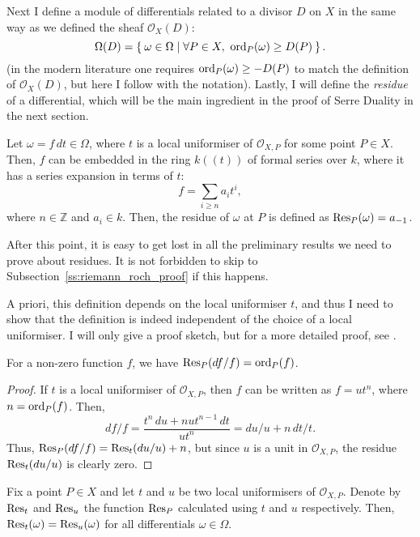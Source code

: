 Next I define a module of differentials related to a divisor $D$
on $X$ in the same way as we defined the sheaf $\mathscr{O}_X(D)$:
\[
  \Omega(D)=\Set{\omega\in\Omega\mid \forall P\in X,\ \operatorname{ord}_{P}(\omega)
  \geq D(P)}.
\]
(in the modern literature one requires $\operatorname{ord}_{P}(\omega)\geq -D(P)$
to match the definition of $\mathscr{O}_X(D)$, but here I follow \cite{serre}
with the notation). Lastly, I will define the \emph{residue} of a
differential, which will be the main ingredient in the proof of Serre
Duality in the next section.
\begin{defin}
  Let $\omega=f\,dt\in\Omega$, where $t$ is a local uniformiser of
  $\mathscr{O}_{X,P}$ for some point $P\in X$. Then, $f$ can be embedded
  in the ring $k((t))$ of formal series over $k$, where it has a series
  expansion in terms of $t$:
  \[
    f=\sum_{i\geq n}a_{i}t^{i},
  \]
  where $n\in\mathbb{Z}$ and $a_{i}\in k$. Then, the residue of $\omega$
  at $P$ is defined as $\operatorname{Res}_{P}(\omega)=a_{-1}$.
\end{defin}
\begin{lnote}
  After this point, it is easy to get lost in all the preliminary
  results we need to prove about residues. It is not forbidden to skip
  to Subsection~\ref{ss:riemann_roch_proof} if this happens.
\end{lnote}
A priori, this definition depends on the local uniformiser $t$, and thus
I need to show that the definition is indeed independent of the choice
of a local uniformiser. I will only give a proof sketch, but for a more
detailed proof, see \cite{serre}.
\begin{lemm}\label{lemm:res_quotient}
  For a non-zero function $f$, we have $\operatorname{Res}_{P}(df/f)=\operatorname{ord}_{P}(f)$.
\end{lemm}
\begin{proof}
  If $t$ is a local uniformiser of $\mathscr{O}_{X,P}$, then $f$ can be
  written as $f=ut^{n}$, where $n=\operatorname{ord}_{P}(f)$. Then,
  \[
    df/f = \frac{t^{n}\,du + nut^{n-1}\,dt}{ut^{n}}=du/u+n\,dt/t.
  \]
  Thus, $\operatorname{Res}_{P}(df/f)=\operatorname{Res}_{t}(du/u)+n$, but since $u$ is a unit in
  $\mathscr{O}_{X,P}$, the residue $\operatorname{Res}_{t}(du/u)$ is clearly zero.
\end{proof}
\begin{prop}
  Fix a point $P\in X$ and let $t$ and $u$ be two local uniformisers of
  $\mathscr{O}_{X,P}$. Denote by $\operatorname{Res}_{t}$ and $\operatorname{Res}_{u}$ the function
  $\operatorname{Res}_{P}$ calculated using $t$ and $u$ respectively. Then,
  $\operatorname{Res}_{t}(\omega)=\operatorname{Res}_{u}(\omega)$ for all differentials $\omega\in\Omega$.
\end{prop}
